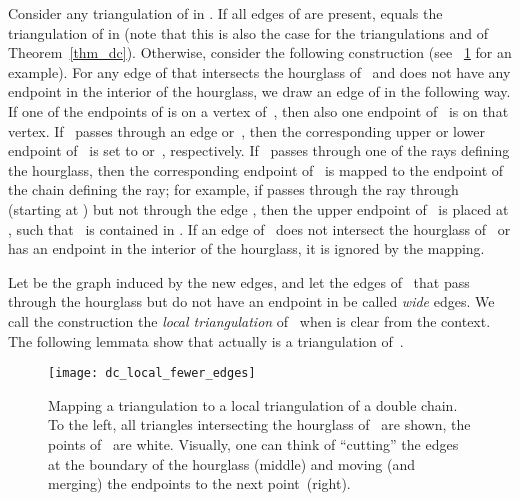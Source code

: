 \documentclass[11pt,a4paper]{article}
\begin{document}
Consider any triangulation  of  in .
If all edges of  are present,  equals the triangulation of  in  (note that this is also the case for the triangulations  and  of Theorem~\ref{thm_dc}).
Otherwise, consider the following construction (see \figurename~\ref{fig_dc_local} for an example).
For any edge  of  that intersects the hourglass of~ and does not have any endpoint in the interior of the hourglass, we draw an edge  of  in the following way.
If one of the endpoints of  is on a vertex of~, then also one endpoint of~ is on that vertex.
If~ passes through an edge  or~, then the corresponding upper or lower endpoint of~ is set to  or~, respectively.
If~ passes through one of the rays defining the hourglass, then the corresponding endpoint of~ is mapped to the endpoint of the chain defining the ray;
for example, if  passes through the ray through~ (starting at ) but not through the edge , then the upper endpoint of~ is placed at , such that~ is contained in .
If an edge of~ does not intersect the hourglass of~ or has an endpoint in the interior of the hourglass, it is ignored by the mapping.

Let   be the graph induced by the new edges, and let the edges of~ that pass through the hourglass but do not have an endpoint in  be called \emph{wide} edges.
We call the construction  the \emph{local triangulation} of~ when  is clear from the context.
The following lemmata show that  actually is a triangulation of~.

\begin{figure}
\centering
\texttt{[image: dc\_local\_fewer\_edges]}
\caption{Mapping a triangulation to a local triangulation of a double chain.
To the left, all triangles intersecting the hourglass of~ are shown, the points of~ are white.
Visually, one can think of ``cutting'' the edges at the boundary of the hourglass (middle) and moving (and merging) the endpoints to the next point~(right).}
\label{fig_dc_local}
\end{figure}
\end{document}
